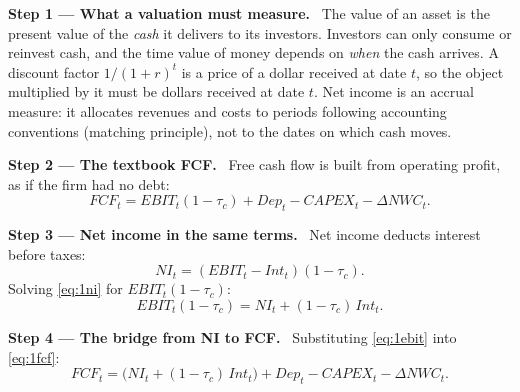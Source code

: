 \documentclass[11pt,a4paper]{article}
\numberwithin{equation}{section}
\newcommand{\step}[2]{\par\medskip\noindent\textbf{Step #1 --- #2.}~}
\begin{document}
\step{1}{What a valuation must measure} The value of an asset is the present value of the
\emph{cash} it delivers to its investors. Investors can only consume or reinvest cash, and the time
value of money depends on \emph{when} the cash arrives. A discount factor $1/(1+r)^t$ is a price of
a dollar received at date $t$, so the object multiplied by it must be dollars received at date $t$.
Net income is an accrual measure: it allocates revenues and costs to periods following accounting
conventions (matching principle), not to the dates on which cash moves.

\step{2}{The textbook FCF} Free cash flow is built from operating profit, as if the firm had no
debt:
\begin{equation}\label{eq:1fcf}
  FCF_t = EBIT_t(1-\tau_c) + Dep_t - CAPEX_t - \Delta NWC_t .
\end{equation}

\step{3}{Net income in the same terms} Net income deducts interest before taxes:
\begin{equation}\label{eq:1ni}
  NI_t = (EBIT_t - Int_t)(1-\tau_c).
\end{equation}
Solving \eqref{eq:1ni} for $EBIT_t(1-\tau_c)$:
\begin{equation}\label{eq:1ebit}
  EBIT_t(1-\tau_c) = NI_t + (1-\tau_c)\,Int_t .
\end{equation}

\step{4}{The bridge from NI to FCF} Substituting \eqref{eq:1ebit} into \eqref{eq:1fcf}:
\begin{equation}\label{eq:1bridge}
  FCF_t = \bigl(NI_t + (1-\tau_c)\,Int_t\bigr) + Dep_t - CAPEX_t - \Delta NWC_t .
\end{equation}
\end{document}
